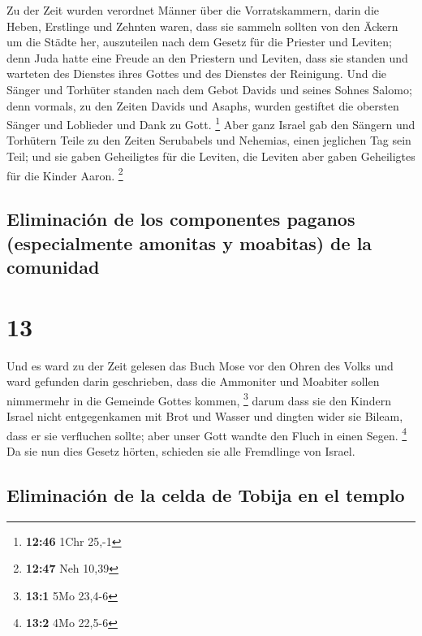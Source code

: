  Zu der Zeit wurden verordnet Männer über die
Vorratskammern, darin die Heben, Erstlinge und Zehnten waren, dass sie
sammeln sollten von den Äckern um die Städte her, auszuteilen nach dem
Gesetz für die Priester und Leviten; denn Juda hatte eine Freude an den
Priestern und Leviten, dass sie standen  und warteten des
Dienstes ihres Gottes und des Dienstes der Reinigung. Und die Sänger und
Torhüter standen nach dem Gebot Davids und seines Sohnes Salomo;
 denn vormals, zu den Zeiten Davids und Asaphs, wurden
gestiftet die obersten Sänger und Loblieder und Dank zu Gott.
\footnote{\textbf{12:46} 1Chr 25,-1}  Aber ganz Israel
gab den Sängern und Torhütern Teile zu den Zeiten Serubabels und
Nehemias, einen jeglichen Tag sein Teil; und sie gaben Geheiligtes für
die Leviten, die Leviten aber gaben Geheiligtes für die Kinder Aaron.
\footnote{\textbf{12:47} Neh 10,39}

\hypertarget{eliminaciuxf3n-de-los-componentes-paganos-especialmente-amonitas-y-moabitas-de-la-comunidad}{%
\subsection{Eliminación de los componentes paganos (especialmente
amonitas y moabitas) de la
comunidad}\label{eliminaciuxf3n-de-los-componentes-paganos-especialmente-amonitas-y-moabitas-de-la-comunidad}}

\hypertarget{section-12}{%
\section{13}\label{section-12}}

 Und es ward zu der Zeit gelesen das Buch Mose vor den
Ohren des Volks und ward gefunden darin geschrieben, dass die Ammoniter
und Moabiter sollen nimmermehr in die Gemeinde Gottes kommen,
\footnote{\textbf{13:1} 5Mo 23,4-6}  darum dass sie den
Kindern Israel nicht entgegenkamen mit Brot und Wasser und dingten wider
sie Bileam, dass er sie verfluchen sollte; aber unser Gott wandte den
Fluch in einen Segen. \footnote{\textbf{13:2} 4Mo 22,5-6} 
Da sie nun dies Gesetz hörten, schieden sie alle Fremdlinge von Israel.

\hypertarget{eliminaciuxf3n-de-la-celda-de-tobija-en-el-templo}{%
\subsection{Eliminación de la celda de Tobija en el
templo}\label{eliminaciuxf3n-de-la-celda-de-tobija-en-el-templo}}

